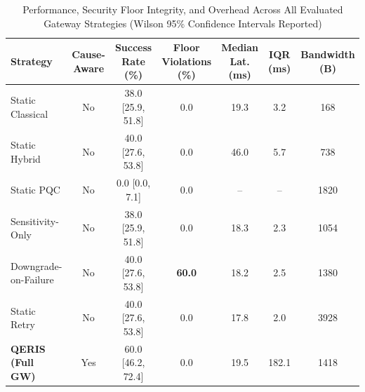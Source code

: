 \begin{table}[t]
\centering
\caption{Performance, Security Floor Integrity, and Overhead Across All Evaluated Gateway Strategies (Wilson 95\% Confidence Intervals Reported)}
\label{tab:baseline_comparison}
\begin{tabular}{lcccccc}
\hline
\textbf{Strategy} & \textbf{Cause-Aware} & \textbf{Success Rate (\%)} & \textbf{Floor Violations (\%)} & \textbf{Median Lat. (ms)} & \textbf{IQR (ms)} & \textbf{Bandwidth (B)} \\
\hline
Static Classical & No & 38.0 [25.9, 51.8] & 0.0 & 19.3 & 3.2 & 168 \\
Static Hybrid & No & 40.0 [27.6, 53.8] & 0.0 & 46.0 & 5.7 & 738 \\
Static PQC & No & 0.0 [0.0, 7.1] & 0.0 & -- & -- & 1820 \\
Sensitivity-Only & No & 38.0 [25.9, 51.8] & 0.0 & 18.3 & 2.3 & 1054 \\
Downgrade-on-Failure & No & 40.0 [27.6, 53.8] & \textbf{60.0} & 18.2 & 2.5 & 1380 \\
Static Retry & No & 40.0 [27.6, 53.8] & 0.0 & 17.8 & 2.0 & 3928 \\
\textbf{QERIS (Full GW)} & Yes & 60.0 [46.2, 72.4] & 0.0 & 19.5 & 182.1 & 1418 \\
\hline
\end{tabular}
\end{table}